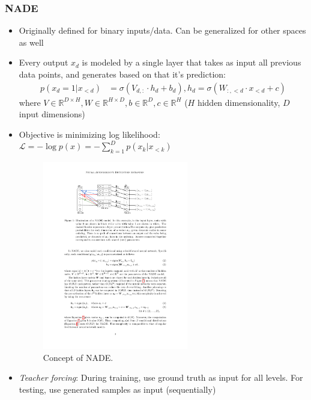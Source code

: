 \subsubsection{NADE}
\begin{itemize}
	\item Originally defined for binary inputs/data. Can be generalized for other spaces as well
	\item Every output $x_d$ is modeled by a single layer that takes as input all previous data points, and generates based on that it's prediction:
	\begin{equation*}
		\begin{split}
			p(x_d=1|x_{<d}) & = \sigma\left(V_{d,:}\cdot h_d + b_d\right), h_d = \sigma\left(W_{:,<d}\cdot x_{<d} + c\right)
		\end{split}
	\end{equation*}
	where $V\in \mathbb{R}^{D\times H}, W\in \mathbb{R}^{H\times D}, b\in \mathbb{R}^{D}, c\in \mathbb{R}^{H}$ ($H$ hidden dimensionality, $D$ input dimensions)
	\item Objective is minimizing log likelihood: $\mathcal{L} = - \log p(x) = - \sum_{k=1}^{D} p(x_k|x_{<k})$
	\begin{figure}[ht!]
		\centering
		\includegraphics[width=0.6\textwidth]{figures/Autoregressive_NADE.pdf}
		\caption{Concept of NADE.}
	\end{figure}
	\item \textit{Teacher forcing}: During training, use ground truth as input for all levels. For testing, use generated samples as input (sequentially)
\end{itemize}

